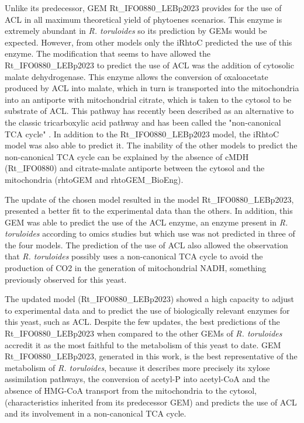 Unlike its predecessor, GEM Rt\_IFO0880\_LEBp2023 provides for the use of ACL in all maximum theoretical yield of phytoenes scenarios.
This enzyme is extremely abundant in \textit{R. toruloides} 
\cite{Zhu2012} so its prediction by GEMs would be expected. However, from other models only the iRhtoC predicted the use of this enzyme. 
The modification that seems to have allowed the Rt\_IFO0880\_LEBp2023 to predict 
the use of ACL was the addition of cytosolic malate dehydrogenase. This enzyme allows the conversion of oxaloacetate produced by ACL into malate, which in turn is 
transported into the mitochondria into an antiporte with mitochondrial citrate, which is taken to the cytosol to be substrate of ACL. This pathway has recently 
been described as an alternative to the classic 
tricarboxylic acid pathway and has been called the "non-canonical TCA cycle" \cite{Arnold2022}. In addition to the
Rt\_IFO0880\_LEBp2023 model, the iRhtoC model was also able to predict it. The inability of the other models to predict the non-canonical TCA cycle can be explained by the absence of cMDH (Rt\_IFO0880) and citrate-malate antiporte 
between the cytosol and the mitochondria (rhtoGEM and rhtoGEM\_BioEng). \cite{DeBiaggi2023}

The update of the chosen model resulted in the model Rt\_IFO0880\_LEBp2023, presented a better fit to the experimental data
than the others. In addition, this GEM was able to predict the use of the ACL enzyme, an enzyme present in \textit{R. toruloides} according to omics studies \cite{Zhu2012}
but which use was not predicted in three of the four models. 
The prediction of the use of ACL also allowed the observation that \textit{R. toruloides} possibly uses a non-canonical TCA cycle to avoid the production of CO2 in 
the generation of mitochondrial NADH, something previously observed for this yeast. \cite{DeBiaggi2023}

The updated model (Rt\_IFO0880\_LEBp2023) showed a high capacity to adjust to experimental data and to predict the use of biologically relevant enzymes for this yeast, 
such as ACL. Despite the few updates, the best predictions of the Rt\_IFO0880\_LEBp2023 when compared to the other GEMs of \textit{R. toruloides} accredit it as the most faithful
 to the metabolism of this yeast to date. GEM Rt\_IFO0880\_LEBp2023, generated in this work, is the best representative of the metabolism of \textit{R. toruloides}, 
 because it describes more precisely its xylose
 assimilation pathways, the conversion of acetyl-P into acetyl-CoA and the absence of HMG-CoA transport from the mitochondria to the cytosol, 
 (characteristics inherited from its predecessor GEM) and predicts the use of ACL and its involvement in a non-canonical TCA cycle. \cite{DeBiaggi2023}

